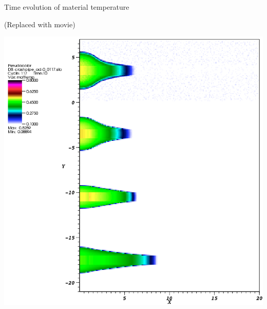 \documentclass{beamer}
\begin{document}
\begin{frame}{Time evolution of material temperature}
\begin{center}
  {\tiny (Replaced with movie)}

  \includegraphics[width=.80\textwidth]{crashpipe2/mattemp_2d0117}
\end{center}
\end{frame}
\end{document}
